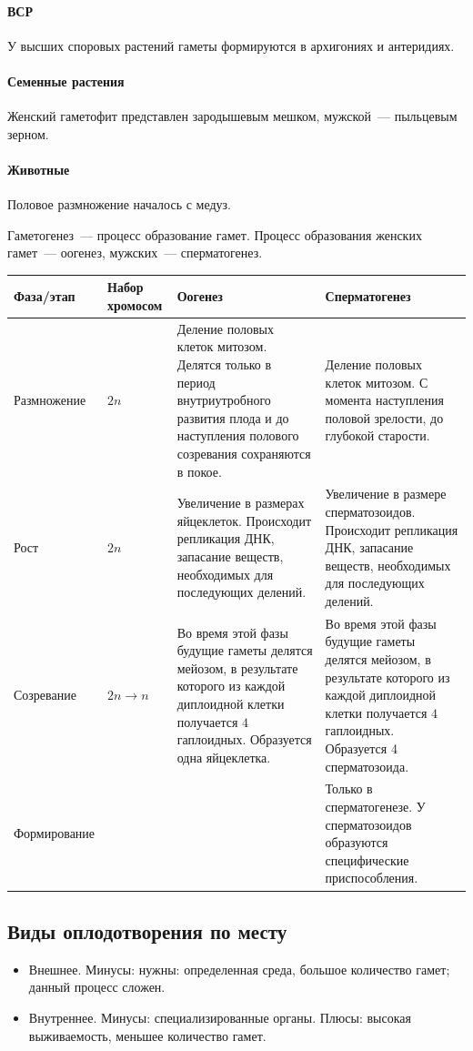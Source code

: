\documentclass[12pt]{article}
\begin{document}
	\paragraph{ВСР} У высших споровых растений гаметы формируются в архигониях и антеридиях.
	\paragraph{Семенные растения} Женский гаметофит представлен зародышевым мешком, мужской~--- пыльцевым зерном.
	\paragraph{Животные} Половое размножение началось с медуз.
	\begin{definition}
		Гаметогенез~--- процесс образование гамет. Процесс образования женских гамет~--- оогенез, мужских~--- сперматогенез.
	\end{definition}
	\begin{xltabular}{\textwidth}{|X|X|X|X|}
		\hline
		Фаза/этап & Набор хромосом & Оогенез & Сперматогенез\\
		\hline
		Размножение & $2n$ & Деление половых клеток митозом. Делятся только в период внутриутробного развития плода и до наступления полового созревания сохраняются в покое. & Деление половых клеток митозом. С момента наступления половой зрелости, до глубокой старости.\\
		\hline
		Рост & $2n$ & Увеличение в размерах яйцеклеток. Происходит репликация ДНК, запасание веществ, необходимых для последующих делений. & Увеличение в размере сперматозоидов. Происходит репликация ДНК, запасание веществ, необходимых для последующих делений.\\
		\hline
		Созревание & $2n \rightarrow n$ & Во время этой фазы будущие гаметы делятся мейозом, в результате которого из каждой диплоидной клетки получается $4$ гаплоидных. Образуется одна яйцеклетка. & Во время этой фазы будущие гаметы делятся мейозом, в результате которого из каждой диплоидной клетки получается $4$ гаплоидных. Образуется 4 сперматозоида. \\
		\hline
		Формирование & & & Только в сперматогенезе. У сперматозоидов образуются специфические приспособления.\\
		\hline
	\end{xltabular}
	\subsection{Виды оплодотворения по месту}
	\begin{itemize}
		\item Внешнее. Минусы: нужны: определенная среда, большое количество гамет; данный процесс сложен.
		\item Внутреннее. Минусы: специализированные органы. Плюсы: высокая выживаемость, меньшее количество гамет.
	\end{itemize}
\end{document}
